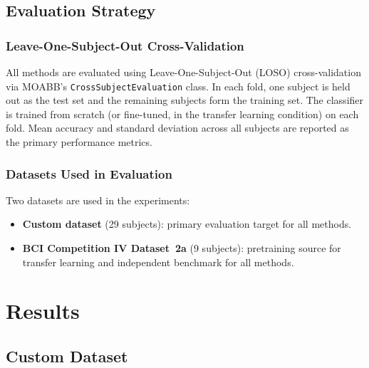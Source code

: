 \documentclass[english, bc, kiv, he, iso690alph, pdf]{fasthesis}
\begin{document}
\section{Evaluation Strategy}

\subsection{Leave-One-Subject-Out Cross-Validation}

All methods are evaluated using Leave-One-Subject-Out (LOSO) cross-validation via MOABB's \texttt{Cross\allowbreak Subject\allowbreak Evaluation} class. In each fold, one subject is held out as the test set and the remaining subjects form the training set. The classifier is trained from scratch (or fine-tuned, in the transfer learning condition) on each fold. Mean accuracy and standard deviation across all subjects are reported as the primary performance metrics.

\subsection{Datasets Used in Evaluation}

Two datasets are used in the experiments:

\begin{itemize}
    \item \textbf{Custom dataset} (29 subjects): primary evaluation target for all methods.
    \item \textbf{BCI Competition IV Dataset~2a} (9 subjects): pretraining source for transfer learning and independent benchmark for all methods.
\end{itemize}

\chapter{Results}

\section{Custom Dataset}
\end{document}
